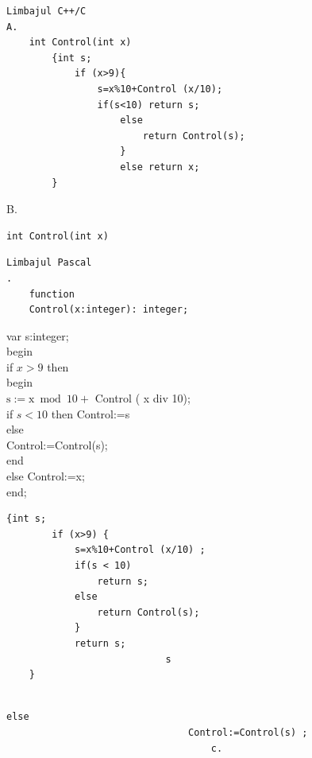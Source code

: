 \documentclass[10pt]{article}
\begin{document}
\begin{verbatim}
Limbajul C++/C
A.
    int Control(int x)
        {int s;
            if (x>9){
                s=x%10+Control (x/10);
                if(s<10) return s;
                    else
                        return Control(s);
                    }
                    else return x;
        }
\end{verbatim}

B.

\begin{verbatim}
int Control(int x)
\end{verbatim}

\begin{verbatim}
Limbajul Pascal
.
    function
    Control(x:integer): integer;
\end{verbatim}

var s:integer;\\
begin\\
if $x>9$ then\\
begin\\
$\mathrm{s}:=\mathrm{x} \bmod 10+$ Control ( x div 10);\\
if $s<10$ then Control:=s\\
else\\
Control:=Control(s);\\
end\\
else Control:=x;\\
end;

\begin{verbatim}
{int s;
        if (x>9) {
            s=x%10+Control (x/10) ;
            if(s < 10)
                return s;
            else
                return Control(s);
            }
            return s;
                            s
    }
\end{verbatim}

\begin{verbatim}
                                                                                                                                        else
                                Control:=Control(s) ;
                                    c.
\end{verbatim}
\end{document}
